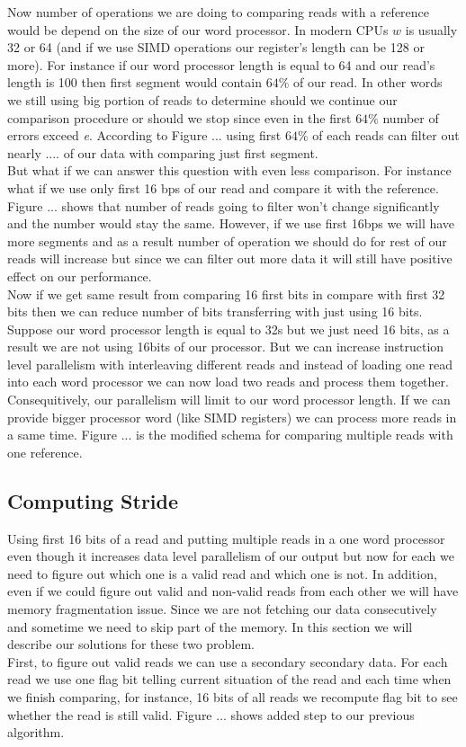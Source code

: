 Now number of operations we are doing to comparing reads with a reference would be depend on the size of our word processor. In modern CPUs $w$ is usually 32 or 64 (and if we use SIMD operations our register's length can be 128 or more). For instance if our word processor length is equal to 64 and our read's length is 100 then first segment would contain $64\%$ of our read. In other words we still using big portion of reads to determine should we continue our comparison procedure or should we stop since even in the first $64\%$ number of errors exceed \emph{e}. According to Figure ... using first $64\%$ of each reads can filter out nearly .... of our data with comparing just first segment.\\
But what if we can answer this question with even less comparison. For instance what if we use only first 16 bps of our read and compare it with the reference. Figure ... shows that number of reads going to filter won't change significantly and the number would stay the same. However, if we use first 16bps we will have more segments and as a result number of operation we should do for rest of our reads will increase but since we can filter out more data it will still have positive effect on our performance.\\
Now if we get same result from comparing 16 first bits in compare with first 32 bits then we can reduce number of bits transferring with just using 16 bits. Suppose our word processor length is equal to 32s but we just need 16 bits, as a result we are not using 16bits of our processor. But we can increase instruction level parallelism with interleaving different reads and instead of loading one read into each word processor we can now load two reads and process them together. Consequitively, our parallelism will limit to our word processor length. If we can provide bigger processor word (like SIMD registers) we can process more reads in a same time. Figure ... is the modified schema for comparing multiple reads with one reference. \\
  
\subsection{Computing Stride} \label{stride}
Using first 16 bits of a read and putting multiple reads in a one word processor even though it increases data level parallelism of our output but now for each we need to figure out which one is a valid read and which one is not. In addition, even if we could figure out valid and non-valid reads from each other we will have memory fragmentation issue. Since we are not fetching our data consecutively and sometime we need to skip part of the memory. In this section we will describe our solutions for these two problem.\\
First, to figure out valid reads we can use a secondary secondary data. For each read we use one flag bit telling current situation of the read and each time when we finish comparing, for instance, 16 bits of all reads we recompute flag bit to see whether the read is still valid. Figure ... shows added step to our previous algorithm.\\

